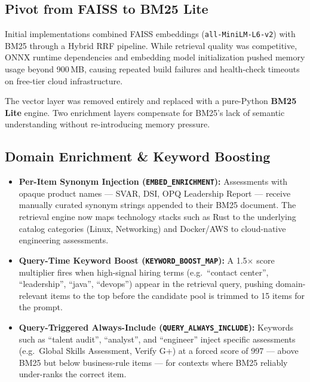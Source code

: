 \documentclass[10pt,twocolumn,letterpaper]{article}
\begin{document}
\subsection{Pivot from FAISS to BM25 Lite}

Initial implementations combined FAISS embeddings
(\texttt{all-MiniLM-L6-v2}) with BM25 through a Hybrid RRF pipeline.
While retrieval quality was competitive, ONNX runtime dependencies and
embedding model initialization pushed memory usage beyond 900\,MB,
causing repeated build failures and health-check timeouts on free-tier
cloud infrastructure.

The vector layer was removed entirely and replaced with a pure-Python
\textbf{BM25 Lite} engine. Two enrichment layers compensate for
BM25's lack of semantic understanding without re-introducing memory
pressure.

\subsection{Domain Enrichment \& Keyword Boosting}

\begin{itemize}

\item \textbf{Per-Item Synonym Injection (\texttt{EMBED\_ENRICHMENT}):}
Assessments with opaque product names --- SVAR, DSI, OPQ Leadership
Report --- receive manually curated synonym strings appended to their
BM25 document. The retrieval engine now maps technology stacks such as
Rust to the underlying catalog categories (Linux, Networking) and
Docker/AWS to cloud-native engineering assessments.

\item \textbf{Query-Time Keyword Boost (\texttt{KEYWORD\_BOOST\_MAP}):}
A 1.5$\times$ score multiplier fires when high-signal hiring terms
(e.g.\ ``contact center'', ``leadership'', ``java'', ``devops'') appear
in the retrieval query, pushing domain-relevant items to the top before
the candidate pool is trimmed to 15 items for the prompt.

\item \textbf{Query-Triggered Always-Include
(\texttt{QUERY\_ALWAYS\_INCLUDE}):}
Keywords such as ``talent audit'', ``analyst'', and ``engineer'' inject
specific assessments (e.g.\ Global Skills Assessment, Verify G+) at a
forced score of 997 --- above BM25 but below business-rule items ---
for contexts where BM25 reliably under-ranks the correct item.

\end{itemize}
\end{document}
